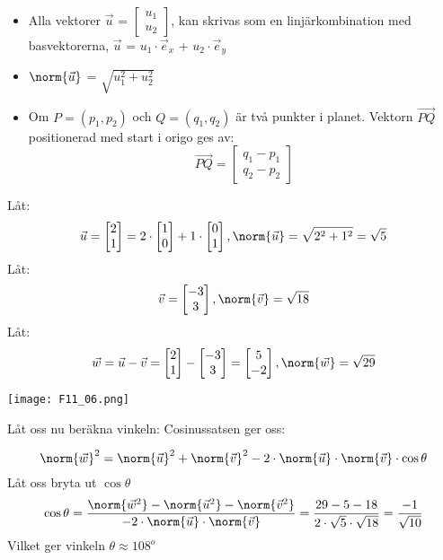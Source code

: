 \begin{itemize}
  \item Alla vektorer $\vec{u}$ = $\begin{bmatrix} u_1 \\ u_2 \end{bmatrix}$, kan skrivas som en linjärkombination med basvektorerna, $\vec{u}$ = $u_1 \cdot \vec{e}_x$ + $u_2 \cdot \vec{e}_y$
  \item $\norm{\vec{u}}$ = $\sqrt{u_1^2 + u_2^2}$
  \item Om $P = (p_1, p_2)$ och $Q = (q_1, q_2)$ är två punkter i planet. Vektorn $\overrightarrow{PQ}$ positionerad med start i origo ges av:
  \[
      \overrightarrow{PQ} = \begin{bmatrix} q_1 - p_1 \\ q_2 - p_2 \end{bmatrix}
  \]
\end{itemize}
\begin{Ex}
    Låt:
    \[
        \vec{u} = \begin{bmatrix} 2 \\ 1 \end{bmatrix} = 2 \cdot \begin{bmatrix} 1 \\ 0 \end{bmatrix} + 1 \cdot \begin{bmatrix} 0 \\ 1 \end{bmatrix}, \norm{\vec{u}} = \sqrt{2^2 + 1^2} = \sqrt{5}
    \]
    Låt:
    \[
      \vec{v} = \begin{bmatrix} -3 \\ 3 \end{bmatrix}, \norm{\vec{v}} = \sqrt{18}
    \]
    Låt:
    \[
        \vec{w} = \vec{u} - \vec{v} = \begin{bmatrix} 2 \\ 1 \end{bmatrix}- \begin{bmatrix} -3 \\ 3 \end{bmatrix} = \begin{bmatrix} 5 \\ -2 \end{bmatrix}, \norm{\vec{w}} = \sqrt{29}
    \]

\begin{center}
  \texttt{[image: F11\_06.png]}
\end{center}
\newpage
Låt oss nu beräkna vinkeln: Cosinussatsen ger oss:

\[
    \norm{\vec{w}}^2 = \norm{\vec{u}}^2 + \norm{\vec{v}}^2 - 2 \cdot \norm{\vec{u}} \cdot \norm{\vec{v}} \cdot \cos{{\theta}}
\]
Låt oss bryta ut $\cos{\theta}$
\[
    \cos{\theta} = \frac{\norm{\vec{w}^2} - \norm{\vec{u}^2} - \norm{\vec{v}^2}}{-2 \cdot \norm{\vec{u}} \cdot \norm{\vec{v}}} = \frac{29 - 5 - 18}{2 \cdot \sqrt{5} \cdot \sqrt{18}} = \frac{-1}{\sqrt{10}}
\]
Vilket ger vinkeln $\theta \approx 108^o$
\end{Ex}



